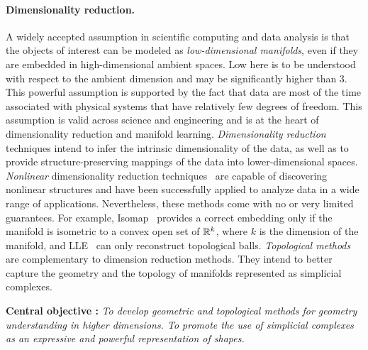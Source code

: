 \paragraph{Dimensionality reduction.} A widely accepted assumption in scientific computing and data analysis is that the objects of interest can be modeled as {\em low-dimensional manifolds}, even if they are embedded in high-dimensional ambient spaces. Low here is to be understood with respect to the ambient dimension and may be significantly higher than 3. This powerful assumption is supported by the fact that data are most of the time associated with physical systems that have relatively few degrees of freedom.  This assumption is valid across science and engineering and is at the heart of dimensionality reduction and manifold learning.
{\em Dimensionality reduction} techniques intend to infer the intrinsic dimensionality of the data, as well as to provide structure-preserving mappings of the data into lower-dimensional spaces. {\em Nonlinear} dimensionality reduction techniques~\cite{lv-nldr-2007} are capable of discovering {nonlinear} structures and have been successfully applied to analyze data in a wide range of applications.
Nevertheless, these methods come with no or very limited guarantees. For example, Isomap~\cite{tsl-isomap-2000} provides a correct embedding only if the manifold is isometric to a convex open set of $\mathbb R ^k$, where $k$ is the dimension of the manifold, and LLE~\cite{rs-lle-2000} can only reconstruct topological balls. {\em Topological methods} are complementary to dimension reduction methods. They intend to better capture the geometry and the topology of manifolds represented as simplicial complexes.

\vspace{2mm}  

{\bf Central objective :} {\em To develop geometric and topological methods for geometry understanding in higher dimensions.  To promote the use  of simplicial complexes as an expressive and powerful representation of shapes. }

